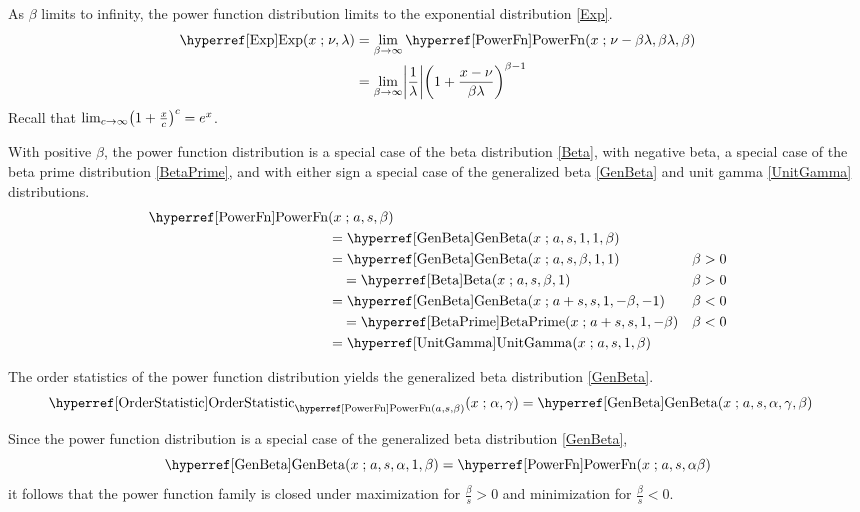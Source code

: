 As $\beta$ limits to infinity, the power function distribution limits to the exponential distribution \eqref{Exp}.
\begin{align*}
\opr{Exp}(x\given \nu,\lambda) &=  \lim_{\beta\rightarrow\infty} \opr{PowerFn} (x\given \nu-\beta\lambda,\beta\lambda,\beta) \checked \\
	&=  \lim_{\beta\rightarrow\infty}  \Left|\frac{1}{ \lambda}\Right| \Left(1+\frac{x-\nu}{\beta\lambda} \Right)^{\beta -1} 
	\checked
\end{align*}
Recall that $\lim_{c\rightarrow\infty} \Left(1 + \frac{x}{c} \Right)^{c} = e^x$. \checked



 

With positive $\beta$, the power function distribution is a special case of the beta distribution \eqref{Beta}, with negative beta, a special case of the beta prime distribution \eqref{BetaPrime}, and with either sign a special case of the generalized beta  \eqref{GenBeta} and unit gamma \eqref{UnitGamma} distributions.
\begin{align*}
	\opr{PowerFn}& (x\given a,s,\beta) 
\\ & = \opr{GenBeta}(x\given a,s , 1,1,\beta) \checked
\\ & = \opr{GenBeta}(x\given a,s , \beta,1,1) & \beta>0 \checked
\\ & \quad = \opr{Beta}(x\given a,s , \beta,1)  & 	\beta>0	\checked
\\ & = \opr{GenBeta}(x\given a+s,s ,1,-\beta,-1) & \beta<0\checked
\\ & \quad = \opr{BetaPrime}(x\given a+s,s , 1,-\beta)  & 	\beta<0\checked
\\ & = \opr{UnitGamma}(x\given a,s,1, \beta) \checked
\end{align*}


 

The order statistics  of the power function distribution yields the generalized beta distribution \eqref{GenBeta}.
\begin{align*}
\opr{OrderStatistic}_{\opr{PowerFn}(a,s,\beta)} &(x \given \alpha, \gamma)  = \opr{GenBeta}(x\given a, s, \alpha,\gamma, \beta) 
\checked
\end{align*}

Since the power function distribution is a special case of the generalized beta distribution \eqref{GenBeta},
\[
 \opr{GenBeta}(x\given a, s, \alpha,1, \beta) = \opr{PowerFn}(x\given a,s,\alpha\beta) \checked
 \notag
\]
it follows that the power function family is closed under maximization for $\tfrac{\beta}{s} > 0$ and minimization for  $\tfrac{\beta}{s}<0$.



